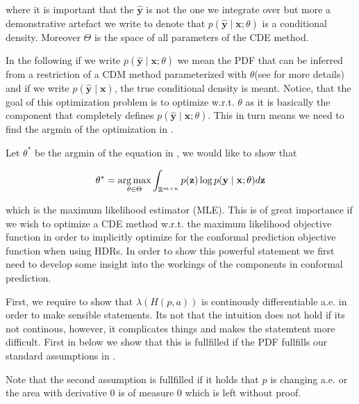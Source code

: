 where it is important that the $\mathbf{\hat{y}}$ is not the one we integrate over but more a demonstrative artefact we write to denote that $p(\mathbf{\hat{y}} \mid \mathbf{x}; \theta)$ is a conditional density. Moreover $\Theta$ is the space of all parameters of the CDE method.

In the following if we write $p(\mathbf{\hat{y}} \mid \mathbf{x}; \theta)$ we mean the PDF that can be inferred from a restriction of a CDM method parameterized with $\theta$(see  for more details) and if we write $p(\mathbf{\hat{y}} \mid \mathbf{x})$, the true conditional density is meant. Notice, that the goal of this optimization problem is to optimize w.r.t. $\theta$ as it is basically the component that completely defines $p(\mathbf{\hat{y}} \mid \mathbf{x}; \theta)$. This in turn means we need to find the argmin of the optimization in .

Let $\theta^*$ be the argmin of the equation in , we would like to show that

\begin{equation}
    \theta^* = \operatorname*{arg\,max}_{\theta \in \Theta}  \int_{\mathbb{R}^{m + n}}
    p(\mathbf{z}) \log p(\mathbf{y} \mid \mathbf{x}; \theta) d
    \mathbf{z}
\end{equation}

which is the maximum likelihood estimator (MLE). This is of great importance if we wish to optimize a CDE method w.r.t. the maximum likelihood objective function in order to implicitly optimize for the conformal prediction objective function when using HDRs. In order to show this powerful statement we first need to develop some insight into the workings of the components in conformal prediction.

First, we require to show that $\lambda(H(p, a))$ is continously differentiable a.e. in order to make sensible statements. Its not that the intuition does not hold if its not continous, however, it complicates things and makes the statemtent more difficult. First in  below we show that this is fullfilled if the PDF fullfills our standard assumptions in .

Note that the second assumption is fullfilled if it holds that $p$ is changing a.e. or the area with derivative $0$ is of measure $0$ which is left without proof. %

